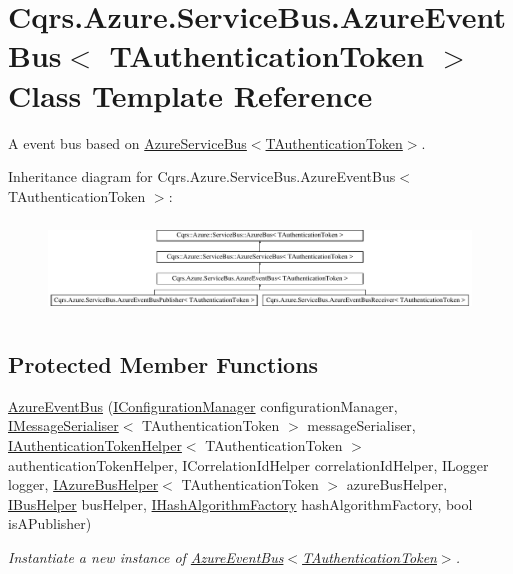 \hypertarget{classCqrs_1_1Azure_1_1ServiceBus_1_1AzureEventBus}{}\section{Cqrs.\+Azure.\+Service\+Bus.\+Azure\+Event\+Bus$<$ T\+Authentication\+Token $>$ Class Template Reference}
\label{classCqrs_1_1Azure_1_1ServiceBus_1_1AzureEventBus}


A event bus based on \hyperlink{classCqrs_1_1Azure_1_1ServiceBus_1_1AzureServiceBus_a09e34bafdb96fb8136efa428df9f80b2_a09e34bafdb96fb8136efa428df9f80b2}{Azure\+Service\+Bus$<$\+T\+Authentication\+Token$>$}.  


Inheritance diagram for Cqrs.\+Azure.\+Service\+Bus.\+Azure\+Event\+Bus$<$ T\+Authentication\+Token $>$\+:\begin{figure}[H]
\begin{center}
\leavevmode
\includegraphics[height=2.533937cm]{classCqrs_1_1Azure_1_1ServiceBus_1_1AzureEventBus}
\end{center}
\end{figure}
\subsection*{Protected Member Functions}
\begin{DoxyCompactItemize}
\item 
\hyperlink{classCqrs_1_1Azure_1_1ServiceBus_1_1AzureEventBus_aeef9b7bc17c3b114a95fe2134e7c0e7a_aeef9b7bc17c3b114a95fe2134e7c0e7a}{Azure\+Event\+Bus} (\hyperlink{interfaceCqrs_1_1Configuration_1_1IConfigurationManager}{I\+Configuration\+Manager} configuration\+Manager, \hyperlink{interfaceCqrs_1_1Azure_1_1ServiceBus_1_1IMessageSerialiser}{I\+Message\+Serialiser}$<$ T\+Authentication\+Token $>$ message\+Serialiser, \hyperlink{interfaceCqrs_1_1Authentication_1_1IAuthenticationTokenHelper}{I\+Authentication\+Token\+Helper}$<$ T\+Authentication\+Token $>$ authentication\+Token\+Helper, I\+Correlation\+Id\+Helper correlation\+Id\+Helper, I\+Logger logger, \hyperlink{interfaceCqrs_1_1Azure_1_1ServiceBus_1_1IAzureBusHelper}{I\+Azure\+Bus\+Helper}$<$ T\+Authentication\+Token $>$ azure\+Bus\+Helper, \hyperlink{interfaceCqrs_1_1Bus_1_1IBusHelper}{I\+Bus\+Helper} bus\+Helper, \hyperlink{interfaceCqrs_1_1Bus_1_1IHashAlgorithmFactory}{I\+Hash\+Algorithm\+Factory} hash\+Algorithm\+Factory, bool is\+A\+Publisher)
\begin{DoxyCompactList}\small\item\em Instantiate a new instance of \hyperlink{classCqrs_1_1Azure_1_1ServiceBus_1_1AzureEventBus_aeef9b7bc17c3b114a95fe2134e7c0e7a_aeef9b7bc17c3b114a95fe2134e7c0e7a}{Azure\+Event\+Bus$<$\+T\+Authentication\+Token$>$}. \end{DoxyCompactList}\end{DoxyCompactItemize}
